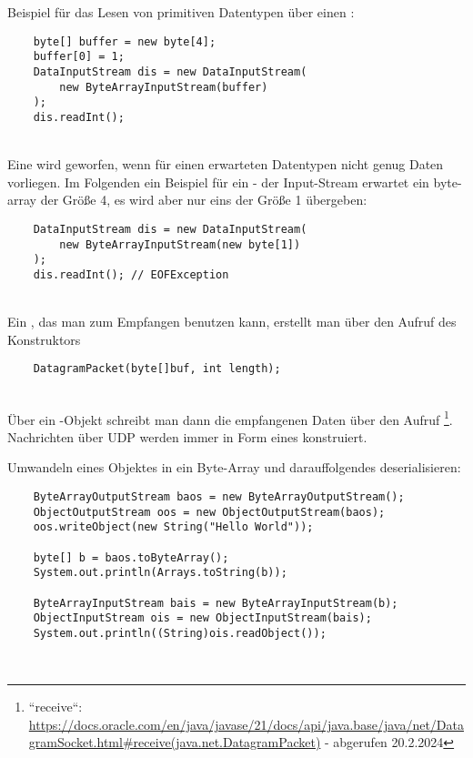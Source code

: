 \noindent
Beispiel für das Lesen von primitiven Datentypen über einen :

\begin{verbatim}
    byte[] buffer = new byte[4];
    buffer[0] = 1;
    DataInputStream dis = new DataInputStream(
        new ByteArrayInputStream(buffer)
    );
    dis.readInt();
\end{verbatim}\\

Eine  wird geworfen, wenn für einen erwarteten Datentypen nicht genug Daten vorliegen.
Im Folgenden ein Beispiel für ein  - der Input-Stream erwartet ein byte-array der Größe 4, es wird aber nur eins
der Größe 1 übergeben:

\begin{verbatim}
    DataInputStream dis = new DataInputStream(
        new ByteArrayInputStream(new byte[1])
    );
    dis.readInt(); // EOFException
\end{verbatim}\\

\noindent
Ein , das man zum Empfangen benutzen kann, erstellt man über den Aufruf des Konstruktors

\begin{verbatim}
    DatagramPacket(byte[]buf, int length);
\end{verbatim}\\

Über ein -Objekt schreibt man dann die empfangenen Daten über den Aufruf \footnote{
``receive``: \url{https://docs.oracle.com/en/java/javase/21/docs/api/java.base/java/net/DatagramSocket.html#receive(java.net.DatagramPacket)} - abgerufen 20.2.2024
}.\\

Nachrichten über UDP werden immer in Form eines  konstruiert.

\noindent
Umwandeln eines Objektes in ein Byte-Array und darauffolgendes deserialisieren:

\begin{verbatim}
    ByteArrayOutputStream baos = new ByteArrayOutputStream();
    ObjectOutputStream oos = new ObjectOutputStream(baos);
    oos.writeObject(new String("Hello World"));

    byte[] b = baos.toByteArray();
    System.out.println(Arrays.toString(b));

    ByteArrayInputStream bais = new ByteArrayInputStream(b);
    ObjectInputStream ois = new ObjectInputStream(bais);
    System.out.println((String)ois.readObject());
\end{verbatim}\\

